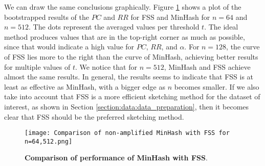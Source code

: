 We can draw the same conclusions graphically. Figure \ref{fig:comparing_minhash_with_fss} shows a plot of the bootstrapped results of the $PC$ and $RR$ for FSS and MinHash for $n=64$ and $n=512$. The dots represent the averaged values per threshold $t$. The ideal method produces values that are in the top-right corner as much as possible, since that would indicate a high value for $PC$, $RR$, and $\alpha$. For $n=128$, the curve of FSS lies more to the right than the curve of MinHash, achieving better results for multiple values of $t$. We notice that for $n=512$, MinHash and FSS achieve almost the same results. In general, the results seems to indicate that FSS is at least as effective as MinHash, with a bigger edge as $n$ becomes smaller. If we also take into account that FSS is a more efficient sketching method for the dataset of interest, as shown in Section \ref{section:data:data_preparation}, then it becomes clear that FSS should be the preferred sketching method.

\begin{figure}
    \centering
    \texttt{[image: Comparison of non-amplified MinHash with FSS for n=64,512.png]}
    \caption[Comparison of performance of MinHash with FSS]{\textbf{Comparison of performance of MinHash with FSS}.}
    \label{fig:comparing_minhash_with_fss}
\end{figure}

